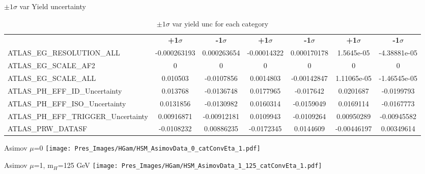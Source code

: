 \documentclass[10pt,UKenglish, leqno, xcolor = dvipsnames]{beamer}
\begin{document}
\begin{frame}{$\pm1\sigma$ var Yield uncertainty}
\begin{table}[tbp]
{\begin{tabular}{lcccccc}
					& \textbf{+1$\sigma$} & \textbf{-1$\sigma$}
					& \textbf{+1$\sigma$} & \textbf{-1$\sigma$}
					& \textbf{+1$\sigma$} & \textbf{-1$\sigma$} \\
					
					\cmidrule(lr){2-3} \cmidrule(lr){4-5} \cmidrule(lr){6-7} 
					ATLAS\_EG\_RESOLUTION\_ALL & -0.000263193 & 0.000263654 & -0.00014322 & 0.000170178 & 1.5645e-05 & -4.38881e-05 \\
					ATLAS\_EG\_SCALE\_AF2  & 0 & 0 & 0 & 0 & 0 &  0 \\
					ATLAS\_EG\_SCALE\_ALL  & 0.010503 & -0.0107856 & 0.0014803 & -0.00142847 & 1.11065e-05 & -1.46545e-05 \\
					ATLAS\_PH\_EFF\_ID\_Uncertainty & 0.013768 & -0.0136748 & 0.0177965 & -0.017642 & 0.0201687 & -0.0199793 \\
					ATLAS\_PH\_EFF\_ISO\_Uncertainty  & 0.0131856 & -0.0130982 & 0.0160314 & -0.0159049 & 0.0169114 & -0.0167773 \\
					ATLAS\_PH\_EFF\_TRIGGER\_Uncertainty & 0.00916871 & -0.00912181 & 0.0109943 & -0.0109264 & 0.00950289 & -0.00945582 \\
					ATLAS\_PRW\_DATASF & -0.0108232 & 0.00886235 & -0.0172345 & 0.0144609 & -0.00446197 & 0.00349614 \\
					\bottomrule[1.5pt]
				\end{tabular}
			}
			\caption{$\pm1\sigma$ var yield unc for each category}
		\end{table}
		\vfill
	\end{frame}
	
	\begin{frame}{Asimov $\mu$=0}
		\vfill
		\centering
		\texttt{[image: Pres\_Images/HGam/HSM\_AsimovData\_0\_catConvEta\_1.pdf]}
		\vfill
	\end{frame}

	\begin{frame}{Asimov $\mu$=1, m$_H$=125 GeV}
		\vfill
		\centering
		\texttt{[image: Pres\_Images/HGam/HSM\_AsimovData\_1\_125\_catConvEta\_1.pdf]}
		\vfill
	\end{frame}
	
\end{document}
